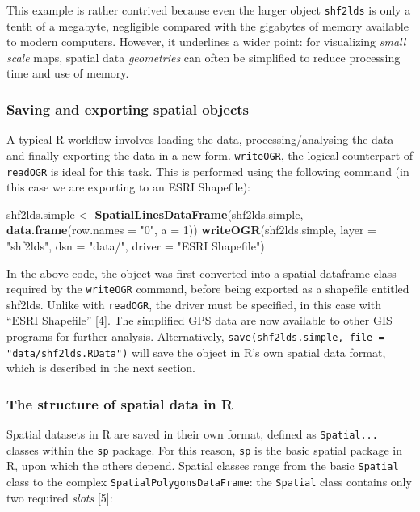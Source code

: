 \documentclass[]{article}
\newenvironment{Shaded}{}{}
\newcommand{\KeywordTok}[1]{\textcolor[rgb]{0.00,0.44,0.13}{\textbf{{#1}}}}
\newcommand{\DataTypeTok}[1]{\textcolor[rgb]{0.56,0.13,0.00}{{#1}}}
\newcommand{\DecValTok}[1]{\textcolor[rgb]{0.25,0.63,0.44}{{#1}}}
\newcommand{\StringTok}[1]{\textcolor[rgb]{0.25,0.44,0.63}{{#1}}}
\newcommand{\NormalTok}[1]{{#1}}
\begin{document}
This example is rather contrived because even the larger object
\texttt{shf2lds} is only a tenth of a megabyte, negligible compared with
the gigabytes of memory available to modern computers. However, it
underlines a wider point: for visualizing \emph{small scale} maps,
spatial data \emph{geometries} can often be simplified to reduce
processing time and use of memory.

\subsubsection{Saving and exporting spatial objects}

A typical R workflow involves loading the data, processing/analysing the
data and finally exporting the data in a new form. \texttt{writeOGR},
the logical counterpart of \texttt{readOGR} is ideal for this task. This
is performed using the following command (in this case we are exporting
to an ESRI Shapefile):

\begin{Shaded}
\begin{Highlighting}[]
\NormalTok{shf2lds.simple <- }\KeywordTok{SpatialLinesDataFrame}\NormalTok{(shf2lds.simple, }\KeywordTok{data.frame}\NormalTok{(}\DataTypeTok{row.names =} \StringTok{"0"}\NormalTok{, }
    \DataTypeTok{a =} \DecValTok{1}\NormalTok{))}
\KeywordTok{writeOGR}\NormalTok{(shf2lds.simple, }\DataTypeTok{layer =} \StringTok{"shf2lds"}\NormalTok{, }\DataTypeTok{dsn =} \StringTok{"data/"}\NormalTok{, }\DataTypeTok{driver =} \StringTok{"ESRI Shapefile"}\NormalTok{)}
\end{Highlighting}
\end{Shaded}
In the above code, the object was first converted into a spatial
dataframe class required by the \texttt{writeOGR} command, before being
exported as a shapefile entitled shf2lds. Unlike with \texttt{readOGR},
the driver must be specified, in this case with ``ESRI Shapefile''
{[}4{]}. The simplified GPS data are now available to other GIS programs
for further analysis. Alternatively,
\texttt{save(shf2lds.simple, file = "data/shf2lds.RData")} will save the
object in R's own spatial data format, which is described in the next
section.

\subsubsection{The structure of spatial data in R}

Spatial datasets in R are saved in their own format, defined as
\texttt{Spatial...} classes within the \texttt{sp} package. For this
reason, \texttt{sp} is the basic spatial package in R, upon which the
others depend. Spatial classes range from the basic \texttt{Spatial}
class to the complex \texttt{SpatialPolygonsDataFrame}: the
\texttt{Spatial} class contains only two required \emph{slots} {[}5{]}:
\end{document}
